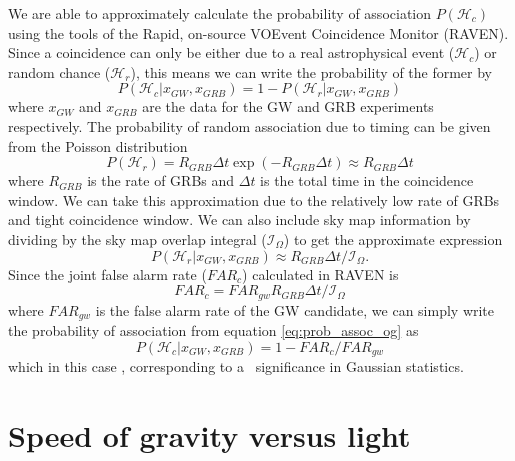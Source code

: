 \documentclass[aps,twocolumn,nofootinbib,nopreprintnumbers,showpacs,linenumbers,floatfix,longbibliography,superscriptaddress,prd]{revtex4-1}
\begin{document}
We are able to approximately calculate the probability of association \(P(\mathcal{H}_{c})\) using the tools of the Rapid, on-source VOEvent Coincidence Monitor (RAVEN). Since a coincidence can only be either due to a real astrophysical event (\(\mathcal{H}_{c}\)) or random chance (\(\mathcal{H}_{r}\)), this means we can write the probability of the former by
\begin{equation}
P(\mathcal{H}_{c} | x_{GW}, x_{GRB}) = 1 - P(\mathcal{H}_{r} | x_{GW}, x_{GRB}) \label{eq:prob_assoc_og}
\end{equation}
where \(x_{GW}\) and \(x_{GRB}\) are the data for the GW and GRB experiments respectively. The probability of random association due to timing can be given from the Poisson distribution
\begin{equation}
P(\mathcal{H}_{r}) = R_{GRB} \Delta t \exp( - R_{GRB} \Delta t) \approx R_{GRB} \Delta t
\end{equation}
where \(R_{GRB}\) is the rate of GRBs and \(\Delta t\) is the total time in the coincidence window. We can take this approximation due to the relatively low rate of GRBs and tight coincidence window.
We can also include sky map information by dividing by the sky map overlap integral (\(\mathcal{I}_{\Omega}\)) \cite{ashton:2018} to get the approximate expression
\begin{equation}
P(\mathcal{H}_{r} | x_{GW}, x_{GRB}) \approx R_{GRB} \Delta t / \mathcal{I}_{\Omega} .
\end{equation}
Since the joint false alarm rate (\(FAR_c\)) calculated in RAVEN is 
\begin{equation}
FAR_c = FAR_{gw} R_{GRB} \Delta t / \mathcal{I}_{\Omega} 
\end{equation}
where \(FAR_{gw}\) is the false alarm rate of the GW candidate, we can simply write the probability of association from equation \eqref{eq:prob_assoc_og} as
\begin{equation}
P(\mathcal{H}_{c} | x_{GW}, x_{GRB}) = 1 - FAR_c / FAR_{gw}
\end{equation}
which in this case \Pvalues, corresponding to a \Ssigma~significance in Gaussian statistics.

\section{Speed of gravity versus light}
\end{document}
